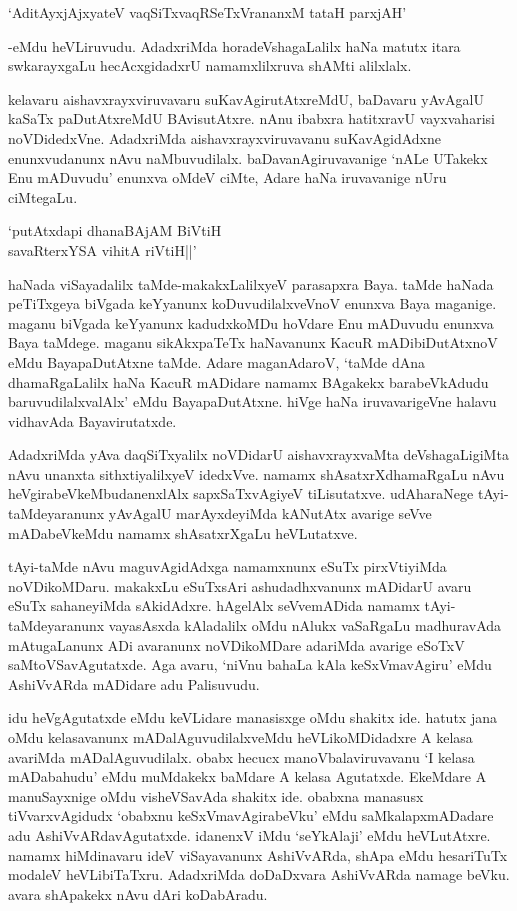 \begin{shloka}
`AditAyxjAjxyateV vaqSiTxvaqRSeTxVrananxM tataH parxjAH'
\end{shloka}

-eMdu heVLiruvudu. AdadxriMda horadeVshagaLalilx haNa matutx itara swkarayxgaLu hecAcxgidadxrU namamxlilxruva shAMti alilxlalx.

kelavaru aishavxrayxviruvavaru suKavAgirutAtxreMdU, baDavaru yAvAgalU kaSaTx paDutAtxreMdU BAvisutAtxre. nAnu ibabxra hatitxravU vayxvaharisi noVDidedxVne. AdadxriMda aishavxrayxviruvavanu suKavAgidAdxne enunxvudanunx nAvu naMbuvudilalx. baDavanAgiruvavanige `nALe UTakekx Enu mADuvudu' enunxva oMdeV ciMte, Adare haNa iruvavanige nUru ciMtegaLu.

\begin{shloka}
`putAtxdapi dhanaBAjAM BiVtiH\\
savaRterxYSA vihitA riVtiH||'
\end{shloka}

haNada viSayadalilx taMde-makakxLalilxyeV parasapxra Baya. taMde haNada peTiTxgeya biVgada keYyanunx koDuvudilalxveVnoV enunxva Baya maganige. maganu biVgada keYyanunx kadudxkoMDu hoVdare Enu mADuvudu enunxva Baya taMdege. maganu sikAkxpaTeTx haNavanunx KacuR mADibiDutAtxnoV eMdu BayapaDutAtxne taMde. Adare maganAdaroV, `taMde dAna dhamaRgaLalilx haNa KacuR mADidare namamx BAgakekx barabeVkAdudu baruvudilalxvalAlx' eMdu BayapaDutAtxne. hiVge haNa iruvavarigeVne halavu vidhavAda Bayavirutatxde.

AdadxriMda yAva daqSiTxyalilx noVDidarU aishavxrayxvaMta deVshagaLigiMta nAvu unanxta sithxtiyalilxyeV idedxVve. namamx shAsatxrXdhamaRgaLu nAvu heVgirabeVkeMbudanenxlAlx sapxSaTxvAgiyeV tiLisutatxve. udAharaNege tAyi-taMdeyaranunx yAvAgalU marAyxdeyiMda kANutAtx avarige seVve mADabeVkeMdu namamx shAsatxrXgaLu heVLutatxve.

tAyi-taMde nAvu maguvAgidAdxga namamxnunx eSuTx pirxVtiyiMda noVDikoMDaru. makakxLu eSuTxsAri ashudadhxvanunx mADidarU avaru eSuTx sahaneyiMda sAkidAdxre. hAgelAlx seVvemADida namamx tAyi-taMdeyaranunx vayasAsxda kAladalilx oMdu nAlukx vaSaRgaLu madhuravAda mAtugaLanunx ADi avaranunx noVDikoMDare adariMda avarige eSoTxV saMtoVSavAgutatxde. Aga avaru, `niVnu bahaLa kAla keSxVmavAgiru' eMdu AshiVvARda mADidare adu Palisuvudu.

idu heVgAgutatxde eMdu keVLidare manasisxge oMdu shakitx ide. hatutx jana oMdu kelasavanunx mADalAguvudilalxveMdu heVLikoMDidadxre A kelasa avariMda mADalAguvudilalx. obabx hecucx manoVbalaviruvavanu `I kelasa mADabahudu' eMdu muMdakekx baMdare A kelasa Agutatxde. EkeMdare A manuSayxnige oMdu visheVSavAda shakitx ide. obabxna manasusx tiVvarxvAgidudx `obabxnu keSxVmavAgirabeVku' eMdu saMkalapxmADadare adu AshiVvARdavAgutatxde. idanenxV iMdu `seYkAlaji' eMdu heVLutAtxre. namamx hiMdinavaru ideV viSayavanunx AshiVvARda, shApa eMdu hesariTuTx modaleV heVLibiTaTxru. AdadxriMda doDaDxvara AshiVvARda namage beVku. avara shApakekx nAvu dAri koDabAradu.

